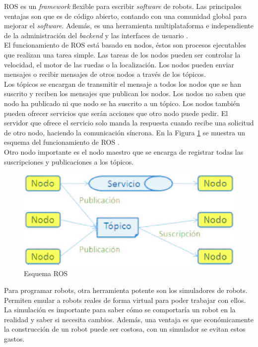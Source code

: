 ROS es un \textit{framework} flexible para escribir \textit{software} de robots. Las principales ventajas son que es de código abierto, contando con una comunidad global para mejorar el \textit{software}. Además, es una herramienta multiplataforma e independiente de la administración del \textit{backend} y las interfaces de usuario \cite{ros}.\\

El funcionamiento de ROS está basado en nodos, éstos son procesos ejecutables que realizan una tarea simple. Las tareas de los nodos pueden ser controlar la velocidad, el motor de las ruedas o la localización. Los nodos pueden enviar mensajes o recibir mensajes de otros nodos a través de los tópicos. \\

Los tópicos se encargan de transmitir el mensaje a todos los nodos que se han suscrito y reciben los mensajes que publican los nodos. Los nodos no saben que nodo ha publicado ni que nodo se ha suscrito a un tópico. Los nodos también pueden ofrecer servicios que serán acciones que otro nodo puede pedir. El servidor que ofrece el servicio solo manda la respuesta cuando recibe una solicitud de otro nodo, haciendo la comunicación síncrona. En la Figura \ref{fig:ros} se muestra un esquema del funcionamiento de ROS \cite{ros2}.\\

Otro nodo importante es el nodo maestro que se encarga de registrar todas las suscripciones y publicaciones a los tópicos.\\

\begin{figure}[H]
    \centering
    \includegraphics[width=12cm, keepaspectratio]{img/ros.png}
    \caption{Esquema ROS}
    \label{fig:ros}
\end{figure}
\newpage
Para programar robots, otra herramienta potente son los simuladores de robots. Permiten emular a robots reales de forma virtual para poder trabajar con ellos. La simulación es importante para saber cómo se comportaría un robot en la realidad y saber si necesita cambios. Además, una ventaja es que económicamente la construcción de un robot puede ser costosa, con un simulador se evitan estos gastos.\\

